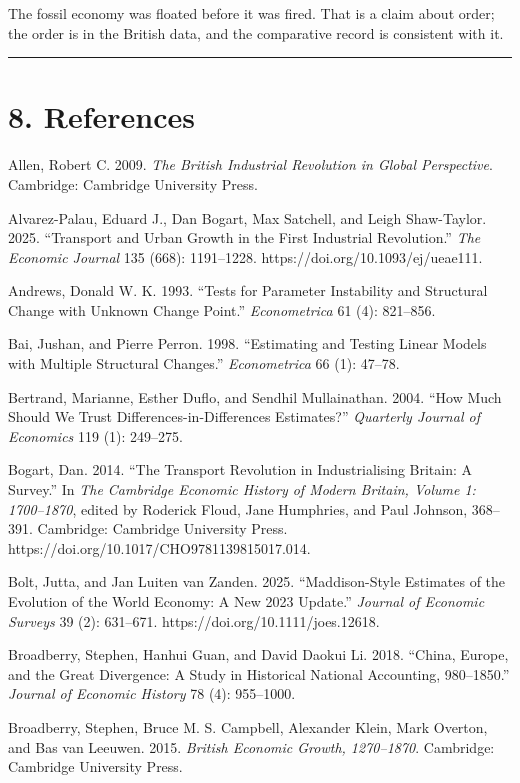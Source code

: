 \documentclass[
  11pt,
]{article}
\begin{document}
The fossil economy was floated before it was fired. That is a claim
about order; the order is in the British data, and the comparative
record is consistent with it.

\begin{center}\rule{0.5\linewidth}{0.5pt}\end{center}

\section{8. References}\label{references}

Allen, Robert C. 2009. \emph{The British Industrial Revolution in Global
Perspective}. Cambridge: Cambridge University Press.

Alvarez-Palau, Eduard J., Dan Bogart, Max Satchell, and Leigh
Shaw-Taylor. 2025. ``Transport and Urban Growth in the First Industrial
Revolution.'' \emph{The Economic Journal} 135 (668): 1191--1228.
https://doi.org/10.1093/ej/ueae111.

Andrews, Donald W. K. 1993. ``Tests for Parameter Instability and
Structural Change with Unknown Change Point.'' \emph{Econometrica} 61
(4): 821--856.

Bai, Jushan, and Pierre Perron. 1998. ``Estimating and Testing Linear
Models with Multiple Structural Changes.'' \emph{Econometrica} 66 (1):
47--78.

Bertrand, Marianne, Esther Duflo, and Sendhil Mullainathan. 2004. ``How
Much Should We Trust Differences-in-Differences Estimates?''
\emph{Quarterly Journal of Economics} 119 (1): 249--275.

Bogart, Dan. 2014. ``The Transport Revolution in Industrialising
Britain: A Survey.'' In \emph{The Cambridge Economic History of Modern
Britain, Volume 1: 1700--1870}, edited by Roderick Floud, Jane
Humphries, and Paul Johnson, 368--391. Cambridge: Cambridge University
Press. https://doi.org/10.1017/CHO9781139815017.014.

Bolt, Jutta, and Jan Luiten van Zanden. 2025. ``Maddison-Style Estimates
of the Evolution of the World Economy: A New 2023 Update.''
\emph{Journal of Economic Surveys} 39 (2): 631--671.
https://doi.org/10.1111/joes.12618.

Broadberry, Stephen, Hanhui Guan, and David Daokui Li. 2018. ``China,
Europe, and the Great Divergence: A Study in Historical National
Accounting, 980--1850.'' \emph{Journal of Economic History} 78 (4):
955--1000.

Broadberry, Stephen, Bruce M. S. Campbell, Alexander Klein, Mark
Overton, and Bas van Leeuwen. 2015. \emph{British Economic Growth,
1270--1870}. Cambridge: Cambridge University Press.
\end{document}
